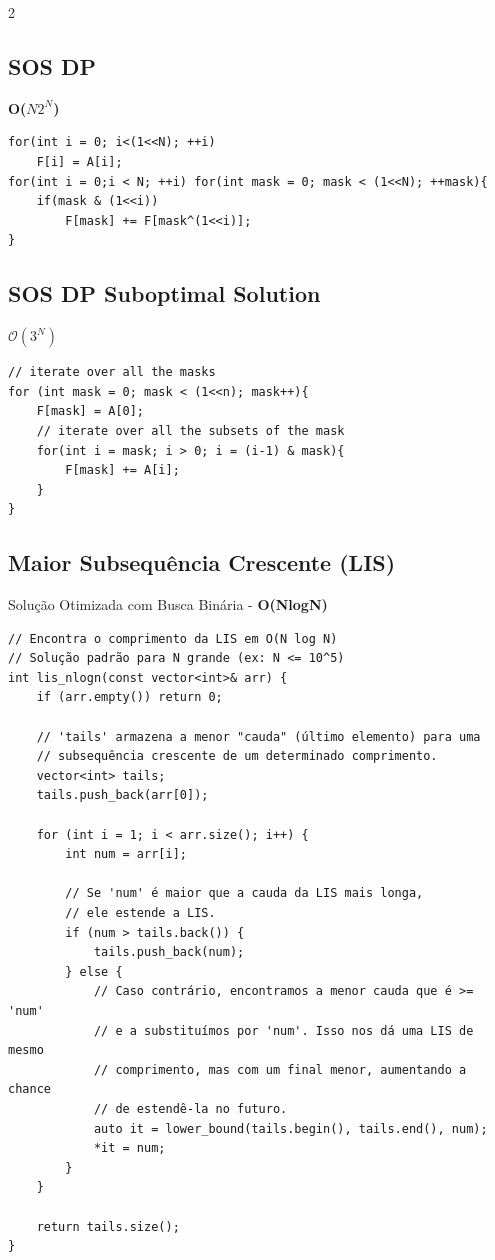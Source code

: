 \documentclass[11pt]{article}
\begin{document}
\begin{multicols}{2}
\subsection{SOS DP}
\textbf{O($N2^N$)}
\begin{lstlisting}
for(int i = 0; i<(1<<N); ++i)
	F[i] = A[i];
for(int i = 0;i < N; ++i) for(int mask = 0; mask < (1<<N); ++mask){
	if(mask & (1<<i))
		F[mask] += F[mask^(1<<i)];
}
\end{lstlisting}

\subsection{SOS DP Suboptimal Solution}
\textbf{$\mathcal{O}(3^N)$}
\begin{lstlisting}
// iterate over all the masks
for (int mask = 0; mask < (1<<n); mask++){
	F[mask] = A[0];
    // iterate over all the subsets of the mask
    for(int i = mask; i > 0; i = (i-1) & mask){
    	F[mask] += A[i];
    }
}
\end{lstlisting}

\subsection{Maior Subsequência Crescente (LIS)}
Solução Otimizada com Busca Binária - \textbf{O(NlogN)}
\begin{lstlisting}
// Encontra o comprimento da LIS em O(N log N)
// Solução padrão para N grande (ex: N <= 10^5)
int lis_nlogn(const vector<int>& arr) {
    if (arr.empty()) return 0;

    // 'tails' armazena a menor "cauda" (último elemento) para uma
    // subsequência crescente de um determinado comprimento.
    vector<int> tails;
    tails.push_back(arr[0]);

    for (int i = 1; i < arr.size(); i++) {
        int num = arr[i];
        
        // Se 'num' é maior que a cauda da LIS mais longa,
        // ele estende a LIS.
        if (num > tails.back()) {
            tails.push_back(num);
        } else {
            // Caso contrário, encontramos a menor cauda que é >= 'num'
            // e a substituímos por 'num'. Isso nos dá uma LIS de mesmo
            // comprimento, mas com um final menor, aumentando a chance
            // de estendê-la no futuro.
            auto it = lower_bound(tails.begin(), tails.end(), num);
            *it = num;
        }
    }

    return tails.size();
}
\end{lstlisting}


\end{multicols}
\end{document}
